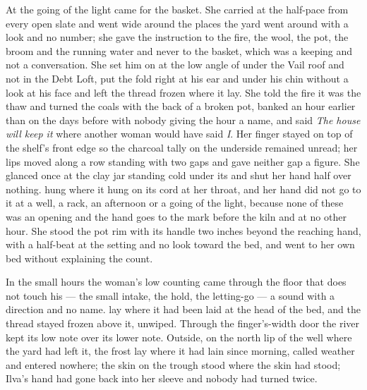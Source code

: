 At the going of the light  came for the basket. She carried at the half-pace from every open slate and went wide around the places the yard went around with a look and no number; she gave the instruction to the fire, the wool, the pot, the broom and the running water and never to the basket, which was a keeping and not a conversation. She set him on  at the low angle of  under the Vail roof and not in the Debt Loft, put the fold right at his ear and under his chin without a look at his face and left the thread frozen where it lay. She told the fire it was the thaw and turned the coals with the back of a broken pot, banked an hour earlier than on the days before with nobody giving the hour a name, and said \emph{The house will keep it} where another woman would have said \emph{I}. Her finger stayed on top of the shelf's front edge so the charcoal tally on the underside remained unread; her lips moved along a row standing with two gaps and gave neither gap a figure. She glanced once at the clay jar standing cold under its  and shut her hand half over nothing.  hung where it hung on its cord at her throat, and her hand did not go to it at a well, a rack, an afternoon or a going of the light, because none of these was an opening and the hand goes to the mark before the kiln and at no other hour. She stood the pot rim with its handle two inches beyond the reaching hand, with a half-beat at the setting and no look toward the bed, and went to her own bed without explaining the count.

In the small hours the woman's low counting came through the floor that does not touch his --- the small intake, the hold, the letting-go --- a sound with a direction and no name.  lay where it had been laid at the head of the bed, and the thread stayed frozen above it, unwiped. Through the finger's-width door the river kept its low note over its lower note. Outside, on the north lip of the well where the yard had left it, the frost lay where it had lain since morning, called weather and entered nowhere; the skin on the trough stood where the skin had stood; Ilva's hand had gone back into her sleeve and nobody had turned twice.

